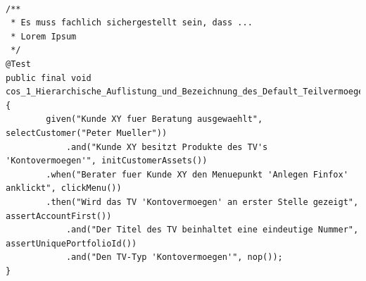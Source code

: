 \begin{lstlisting}[caption={Beispielhaftes Codestück eines \Gls{BDD} Tests},label=lst:bddcode]

/**
 * Es muss fachlich sichergestellt sein, dass ...
 * Lorem Ipsum
 */
@Test
public final void cos_1_Hierarchische_Auflistung_und_Bezeichnung_des_Default_Teilvermoegens_Kontovermoegen() {
		given("Kunde XY fuer Beratung ausgewaehlt", selectCustomer("Peter Mueller"))
			.and("Kunde XY besitzt Produkte des TV's 'Kontovermoegen'", initCustomerAssets())
		.when("Berater fuer Kunde XY den Menuepunkt 'Anlegen Finfox' anklickt", clickMenu())
		.then("Wird das TV 'Kontovermoegen' an erster Stelle gezeigt", assertAccountFirst())
			.and("Der Titel des TV beinhaltet eine eindeutige Nummer", assertUniquePortfolioId())
			.and("Den TV-Typ 'Kontovermoegen'", nop());
}
\end{lstlisting}

